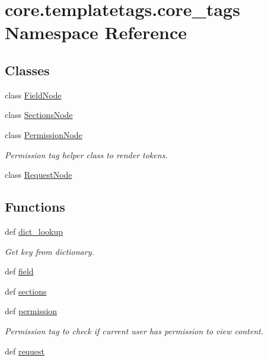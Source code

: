 \hypertarget{namespacecore_1_1templatetags_1_1core__tags}{\section{core.\-templatetags.\-core\-\_\-tags Namespace Reference}
\label{namespacecore_1_1templatetags_1_1core__tags}
}
\subsection*{Classes}
\begin{DoxyCompactItemize}
\item 
class \hyperlink{classcore_1_1templatetags_1_1core__tags_1_1FieldNode}{Field\-Node}
\item 
class \hyperlink{classcore_1_1templatetags_1_1core__tags_1_1SectionsNode}{Sections\-Node}
\item 
class \hyperlink{classcore_1_1templatetags_1_1core__tags_1_1PermissionNode}{Permission\-Node}
\begin{DoxyCompactList}\small\item\em Permission tag helper class to render tokens. \end{DoxyCompactList}\item 
class \hyperlink{classcore_1_1templatetags_1_1core__tags_1_1RequestNode}{Request\-Node}
\end{DoxyCompactItemize}
\subsection*{Functions}
\begin{DoxyCompactItemize}
\item 
def \hyperlink{namespacecore_1_1templatetags_1_1core__tags_af92c55f7e892fe651c8b6ff6d1dbafa6}{dict\-\_\-lookup}
\begin{DoxyCompactList}\small\item\em Get key from dictionary. \end{DoxyCompactList}\item 
def \hyperlink{namespacecore_1_1templatetags_1_1core__tags_a8bdb86d6c26e22c6b9731e3c4ad3a10a}{field}
\item 
def \hyperlink{namespacecore_1_1templatetags_1_1core__tags_ac826a1007f9141675afeafc5a738665a}{sections}
\item 
def \hyperlink{namespacecore_1_1templatetags_1_1core__tags_aa6a655b7b5cb385c80f93023b0a52318}{permission}
\begin{DoxyCompactList}\small\item\em Permission tag to check if current user has permission to view content. \end{DoxyCompactList}\item 
def \hyperlink{namespacecore_1_1templatetags_1_1core__tags_a346a8359784db8a70d8236136aa36e3e}{request}
\end{DoxyCompactItemize}
